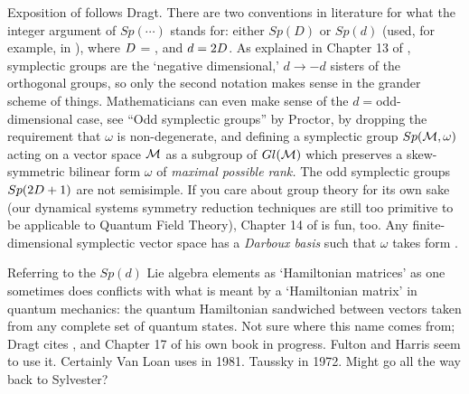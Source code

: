 
Exposition of  follows Dragt.
There are two conventions in literature for what the integer argument of
$Sp(\cdots)$ stands for: either $Sp(D)$ or $Sp(d)$ (used, for example, in
), where $D$ = \dof, and $d=2D$. As explained
in Chapter 13 of , symplectic groups are the `negative
dimensional,' $d \to -d$ sisters of the orthogonal groups, so only the
second notation makes sense in the grander scheme of things.
Mathematicians can even make sense of the $d= $odd-dimensional case,
see ``Odd symplectic groups'' by Proctor, by dropping
the requirement that $\omega$ is non-degenerate, and defining
a symplectic group $Sp({\cal M},\omega)$ acting on a vector space ${\cal M}$
as a subgroup of $Gl({\cal M})$ which preserves a skew-symmetric bilinear form
$\omega$ of \emph{maximal possible rank.} The odd symplectic groups
$Sp(2D+1)$ are not semisimple.
If you care about group theory for its own sake (our dynamical systems
symmetry reduction techniques are still too primitive to be applicable to
Quantum Field Theory), Chapter 14  of  is fun, too.
%
Any finite-dimensional symplectic vector space has a \emph{Darboux basis}
such that $\omega$ takes form .

Referring to the $Sp(d)$ Lie algebra elements as  `Hamiltonian matrices'
as one sometimes does conflicts with
what is meant by a `Hamiltonian matrix' in quantum mechanics: the quantum
Hamiltonian sandwiched between vectors taken from any complete set of
quantum states. Not sure where this name comes from; Dragt cites
, and  Chapter 17 of his own book in
progress. %
Fulton and Harris seem to use it. Certainly Van
Loan uses in 1981. Taussky in 1972. Might go all the way back
to Sylvester?

